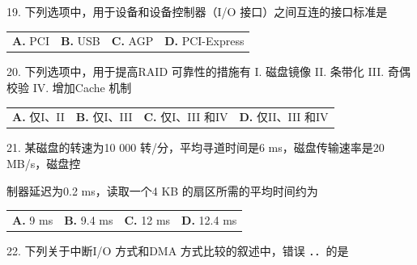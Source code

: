 \documentclass[UTF8,11pt]{ctexart}
\begin{document}
19. 下列选项中，用于设备和设备控制器（I/O 接口）之间互连的接口标准是


\begin{center}\begin{tabular}{>{\raggedright\arraybackslash}p{\dimexpr(\linewidth-8\tabcolsep)/4\relax}>{\raggedright\arraybackslash}p{\dimexpr(\linewidth-8\tabcolsep)/4\relax}>{\raggedright\arraybackslash}p{\dimexpr(\linewidth-8\tabcolsep)/4\relax}>{\raggedright\arraybackslash}p{\dimexpr(\linewidth-8\tabcolsep)/4\relax}}
\textbf{A.} PCI & \textbf{B.} USB & \textbf{C.} AGP & \textbf{D.} PCI-Express\\[.35em]\end{tabular}\end{center}

20. 下列选项中，用于提高RAID 可靠性的措施有 I. 磁盘镜像 II. 条带化 III. 奇偶校验 IV. 增加Cache 机制


\begin{center}\begin{tabular}{>{\raggedright\arraybackslash}p{\dimexpr(\linewidth-8\tabcolsep)/4\relax}>{\raggedright\arraybackslash}p{\dimexpr(\linewidth-8\tabcolsep)/4\relax}>{\raggedright\arraybackslash}p{\dimexpr(\linewidth-8\tabcolsep)/4\relax}>{\raggedright\arraybackslash}p{\dimexpr(\linewidth-8\tabcolsep)/4\relax}}
\textbf{A.} 仅I、II & \textbf{B.} 仅I、III & \textbf{C.} 仅I、III 和IV & \textbf{D.} 仅II、III 和IV\\[.35em]\end{tabular}\end{center}

21. 某磁盘的转速为10 000 转/分，平均寻道时间是6 ms，磁盘传输速率是20 MB/s，磁盘控


制器延迟为0.2 ms，读取一个4 KB 的扇区所需的平均时间约为


\begin{center}\begin{tabular}{>{\raggedright\arraybackslash}p{\dimexpr(\linewidth-8\tabcolsep)/4\relax}>{\raggedright\arraybackslash}p{\dimexpr(\linewidth-8\tabcolsep)/4\relax}>{\raggedright\arraybackslash}p{\dimexpr(\linewidth-8\tabcolsep)/4\relax}>{\raggedright\arraybackslash}p{\dimexpr(\linewidth-8\tabcolsep)/4\relax}}
\textbf{A.} 9 ms & \textbf{B.} 9.\allowbreak{}4 ms & \textbf{C.} 12 ms & \textbf{D.} 12.\allowbreak{}4 ms\\[.35em]\end{tabular}\end{center}

22. 下列关于中断I/O 方式和DMA 方式比较的叙述中，错误 ．．的是
\end{document}
